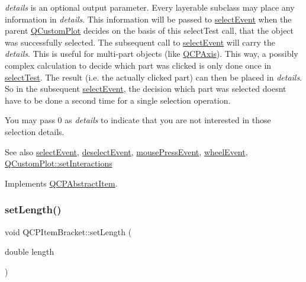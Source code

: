 {\itshape details} is an optional output parameter. Every layerable subclass may place any information in {\itshape details}. This information will be passed to \hyperlink{class_q_c_p_abstract_item_aa4b969c58797f39c9c0b6c07c7869d17}{select\+Event} when the parent \hyperlink{class_q_custom_plot}{Q\+Custom\+Plot} decides on the basis of this select\+Test call, that the object was successfully selected. The subsequent call to \hyperlink{class_q_c_p_abstract_item_aa4b969c58797f39c9c0b6c07c7869d17}{select\+Event} will carry the {\itshape details}. This is useful for multi-\/part objects (like \hyperlink{class_q_c_p_axis}{Q\+C\+P\+Axis}). This way, a possibly complex calculation to decide which part was clicked is only done once in \hyperlink{class_q_c_p_item_bracket_a49a6b2f41e0a8c2a2e3a2836027a8455}{select\+Test}. The result (i.\+e. the actually clicked part) can then be placed in {\itshape details}. So in the subsequent \hyperlink{class_q_c_p_abstract_item_aa4b969c58797f39c9c0b6c07c7869d17}{select\+Event}, the decision which part was selected doesn\textquotesingle{}t have to be done a second time for a single selection operation.

You may pass 0 as {\itshape details} to indicate that you are not interested in those selection details.

\begin{DoxySeeAlso}{See also}
\hyperlink{class_q_c_p_abstract_item_aa4b969c58797f39c9c0b6c07c7869d17}{select\+Event}, \hyperlink{class_q_c_p_abstract_item_af9093798cb07a861dcc73f93ca16c0c1}{deselect\+Event}, \hyperlink{class_q_c_p_layerable_af6567604818db90f4fd52822f8bc8376}{mouse\+Press\+Event}, \hyperlink{class_q_c_p_layerable_a47dfd7b8fd99c08ca54e09c362b6f022}{wheel\+Event}, \hyperlink{class_q_custom_plot_a5ee1e2f6ae27419deca53e75907c27e5}{Q\+Custom\+Plot\+::set\+Interactions} 
\end{DoxySeeAlso}


Implements \hyperlink{class_q_c_p_abstract_item_ae41d0349d68bb802c49104afd100ba2a}{Q\+C\+P\+Abstract\+Item}.

\mbox{\label{class_q_c_p_item_bracket_ac7cfc3da7da9b5c5ac5dfbe4f0351b2a}} 
\subsubsection{\texorpdfstring{set\+Length()}{setLength()}}
{\footnotesize\ttfamily void Q\+C\+P\+Item\+Bracket\+::set\+Length (\begin{DoxyParamCaption}\item[{double}]{length }\end{DoxyParamCaption})}

